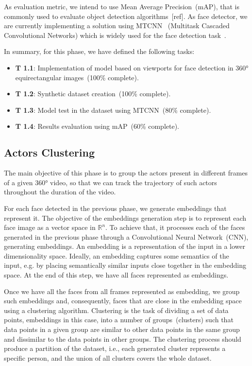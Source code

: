 As evaluation metric, we intend to use Mean Average Precision~(mAP), that is commonly used to evaluate object detection algorithms~[ref]. As face detector, we are currently implementing a solution using MTCNN~\cite{mtcnn} (Multitask Cascaded Convolutional Networks) which is widely used for the face detection task~\cite{mtcnn1, mtcnn2, mtcnn3}. %

In summary, for this phase, we have defined the following tasks:

\begin{itemize}
    \item \textbf{T 1.1}: Implementation of model based on viewports for face detection in 360° equirectangular images~(100\% complete).
    \item \textbf{T 1.2}: Synthetic dataset creation~(100\% complete).
    \item \textbf{T 1.3}: Model test in the dataset using MTCNN~(80\% complete).
    \item \textbf{T 1.4}: Results evaluation using mAP~(60\% complete).
\end{itemize}


\subsection{Actors Clustering}

The main objective of this phase is to group the actors present in different frames of a given 360° video, so that we can track the trajectory of such actors throughout the duration of the video. 

For each face detected in the previous phase, we generate embeddings that represent it.
The objective of the embeddings generation step is to represent each face image as a vector space in $\mathbb{R}^{n}$.
To achieve that, it processes each of the faces generated in the previous phase through a Convolutional Neural Network~(CNN), generating embeddings. 
An embedding is a representation of the input in a lower dimensionality space.
Ideally, an embedding captures some semantics of the input, e.g. by placing semantically similar inputs close together in the embedding space.
%
At the end of this step, we have all faces represented as embeddings.

Once we have all the faces from all frames represented as embedding, we group such embeddings and, consequently, faces that are close in the embedding space using a clustering algorithm. 
%
Clustering is the task of dividing a set of data points, embeddings in this case, into a number of groups~(clusters) such that data points in a given group are similar to other data points in the same group and dissimilar to the data points in other groups.
The clustering process should produce a partition of the dataset, i.e., each generated cluster represents a specific person, and the union of all clusters covers the whole dataset.

